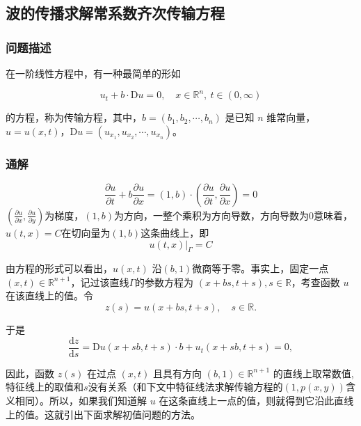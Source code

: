 \documentclass[12pt,a4paper]{article}
\numberwithin{subsection}{section}   %
\numberwithin{subsubsection}{subsection}
\theoremstyle{plain}
\theoremstyle{definition}
\theoremstyle{remark}
\theoremstyle{remark}
\begin{document}
	
	\subsection{波的传播求解常系数齐次传输方程} 
	\subsubsection{问题描述}
	在一阶线性方程中，有一种最简单的形如
	
	\begin{equation}
		u_t + b \cdot \mathrm{D}u = 0, \quad x \in \mathbb{R}^n, \ t \in (0, \infty)
	\end{equation}
	
	的方程，称为传输方程，其中，\(b = (b_1, b_2, \cdots, b_n)\) 是已知 \(n\) 维常向量，\(u = u(x, t)\)，\(\mathrm{D}u = (u_{x_1}, u_{x_2}, \cdots, u_{x_n})\)。
	
		\subsubsection{通解} 
			\begin{equation}
			\frac{\partial u}{\partial t} + b \frac{\partial u}{\partial x}=(1, b) \cdot \left( \frac{\partial u}{\partial t}, \frac{\partial u}{\partial x} \right) = 0 
		\end{equation}
		$\left( \frac{\partial u}{\partial x}, \frac{\partial u}{\partial y} \right)$为梯度，$(1, b)$为方向，一整个乘积为方向导数，方向导数为0意味着，$u(t, x)=C$在切向量为$(1, b)$这条曲线上，即
		\begin{equation}
			u(t,x)|_{\Gamma} = C
		\end{equation}
		
	
	由方程的形式可以看出，\(u(x, t)\) 沿$(b, 1)$微商等于零。事实上，固定一点 \((x, t) \in \mathbb{R}^{n+1}\)，记过该直线$\Gamma$的参数方程为 \((x + bs, t + s), s \in \mathbb{R}\)，考查函数 \(u\) 在该直线上的值。令
\begin{equation}
	z(s) = u(x + bs, t + s), \quad s \in \mathbb{R}.
	\end{equation}
	
	于是
	\begin{equation}
	\frac{\mathrm{d}z}{\mathrm{d}s} = \mathrm{D}u(x + sb, t + s) \cdot b + u_t(x + sb, t + s) = 0,
	\end{equation}
	
	因此，函数 \(z(s)\) 在过点 \((x, t)\) 且具有方向 \((b, 1) \in \mathbb{R}^{n+1}\) 的直线上取常数值,特征线上的取值和$s$没有关系（和下文中特征线法求解传输方程的$(1, p(x, y))$含义相同）。所以，如果我们知道解 \(u\) 在这条直线上一点的值，则就得到它沿此直线上的值。这就引出下面求解初值问题的方法。
	
\end{document}
